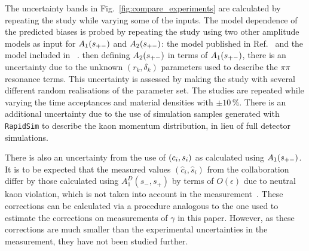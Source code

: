 The uncertainty bands in Fig.~\ref{fig:compare_experiments} are calculated by repeating the study while varying some of the inputs. The model dependence of the predicted biases is probed by repeating the study using two other amplitude models as input for $A_1(s_{+-})$ and $A_2(s_{+-})$: the model published in Ref.~\cite{BELLE2010} and the model included in \normalfont~\cite{EvtGen}. 
then defining $A_2(s_{+-})$ in terms of $A_1(s_{+-})$, there is an uncertainty due to the unknown $(r_k, \delta_k)$ parameters used to describe the $\pi\pi$ resonance terms. This uncertainty is assessed by making the study with several different random realisations of the parameter set. 
The studies are repeated while varying the time acceptances and material densities with $\pm 10\,\%$. 
There is an additional uncertainty due to the use of simulation samples generated with \texttt{RapidSim} to describe the kaon momentum distribution, in lieu of full detector simulations. 

There is also an uncertainty from the use of $(c_i, s_i)$ as calculated using $A_1(s_{+-})$. It is to be expected that the measured values $(\hat c_i, \hat s_i)$ from the \cleo collaboration differ by those calculated using $A_1^D(s_-,s_+)$ by terms of $O(\epsilon)$ due to neutral kaon \CP violation, which is not taken into account in the measurement~\cite{CLEOCISI}. These corrections can be calculated via a procedure analogous to the one used to estimate the corrections on measurements of $\gamma$ in this paper. However, as these corrections are much smaller than the experimental uncertainties in the measurement, they have not been studied further.



